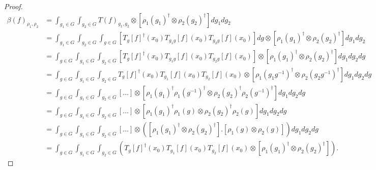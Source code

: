 \documentclass{article}
\begin{document}
\begin{proof}
    \begin{align*}
    \beta(f)_{\rho_1, \rho_2}
    &=  \int_{g_1 \in G} \int_{g_2 \in G}
        T(f)_{g_1, g_2} \otimes
            \left[
                \rho_1(g_1)^\dagger \otimes \rho_2(g_2)^\dagger
            \right]
            dg_1 dg_2 \\
    &=
    \int_{g_1 \in G} \int_{g_2 \in G}
        \int_{g \in G}
                \left[ T_{g}[f]^\dagger (x_0) T_{g_1g}[f](x_0) T_{g_2g}[f](x_0)
                    \right]dg
            \otimes
              \left[
                \rho_1(g_1)^\dagger \otimes \rho_2(g_2)^\dagger
              \right]
            dg_1 dg_2 \\
    &=\int_{g \in G}
      \int_{g_1 \in G} \int_{g_2 \in G}
                  \left[T_{g}[f]^\dagger (x_0)T_{g_1g}[f](x_0) T_{g_2g}[f](x_0)
                    \right]
                \otimes
              \left[
                \rho_1(g_1)^\dagger \otimes \rho_2(g_2)^\dagger
              \right]
            dg_1 dg_2dg\\
    &=\int_{g \in G}
      \int_{g_1 \in G} \int_{g_2 \in G}
               T_{g}[f]^\dagger (x_0) T_{g_1}[f](x_0) T_{g_2}[f](x_0)
                \otimes
              \left[
                \rho_1(g_1g^{-1})^\dagger \otimes \rho_2(g_2g^{-1})^\dagger
              \right]
            dg_1 dg_2 dg\\
    &=\int_{g \in G}
      \int_{g_1 \in G} \int_{g_2 \in G}
            [...]
                \otimes
              \left[
                \rho_1(g_1)^\dagger \rho_1(g^{-1})^\dagger \otimes \rho_2(g_2)^\dagger \rho_2(g^{-1})^\dagger
              \right]
            dg_1 dg_2dg\\
        &=\int_{g \in G}
      \int_{g_1 \in G} \int_{g_2 \in G}
            [...]
                \otimes
              \left[
                \rho_1(g_1)^\dagger \rho_1(g) \otimes \rho_2(g_2)^\dagger \rho_2(g)
              \right]
            dg_1 dg_2dg\\
        &=\int_{g \in G}
      \int_{g_1 \in G} \int_{g_2 \in G}
            [...]
                \otimes \left(
              \left[
                \rho_1(g_1)^\dagger \otimes \rho_2(g_2)^\dagger \right] . \left[\rho_1(g) \otimes  \rho_2(g)
              \right] \right)
            dg_1 dg_2dg\\
            &=\int_{g \in G}
      \int_{g_1 \in G} \int_{g_2 \in G}
       \left(T_{g}[f]^\dagger (x_0) T_{g_1}[f](x_0) T_{g_2}[f](x_0)
                \otimes
              \left[
                \rho_1(g_1)^\dagger \otimes \rho_2(g_2)^\dagger \right]\right)  .

\end{align*}
\end{proof}
\end{document}
